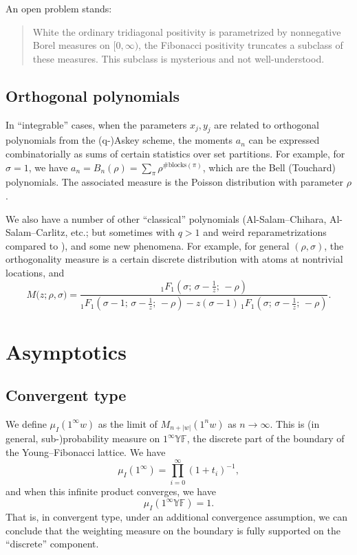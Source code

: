 \documentclass[letterpaper,11pt,oneside,reqno]{article}
\numberwithin{equation}{section}
\theoremstyle{definition}
\begin{document}
An open problem stands:
\begin{quote}
	White the ordinary tridiagonal positivity is parametrized by
	nonnegative
	Borel measures on $[0,\infty)$, the Fibonacci positivity
	truncates a subclass of these measures. This
	subclass is mysterious and not well-understood.
\end{quote}

\subsection{Orthogonal polynomials}

In ``integrable'' cases, when the
parameters $x_j,y_j$ are related to orthogonal polynomials
from the (q-)Askey scheme,
the moments $a_n$ can be expressed combinatorially
as sums of certain statistics over set partitions.
For example, for $\sigma=1$, we have
$a_n=B_n(\rho)=\sum_\pi \rho^{\#\text{blocks}(\pi)}$,
which are the Bell (Touchard) polynomials.
The associated measure is the Poisson distribution
with parameter $\rho$.

We also have a number of other ``classical'' polynomials
(Al-Salam--Chihara, Al-Salam--Carlitz, etc.; but sometimes with $q>1$ and
weird reparametrizations compared to \cite{Koekoek1996}),
and some new phenomena. For example, for general $(\rho,\sigma)$,
the orthogonality measure is
a certain discrete distribution with atoms at nontrivial locations, and
\begin{equation}
	\label{eq:MGF_shifted_charlier_solution}
	M\big(z;\rho, \sigma\big)
	= \frac{
	{_1F_1}\left(\sigma  ; \, \sigma - \frac{1}{z}  ; \, -\rho \right)
	}{
	{_1F_1}\left(\sigma - 1 ; \, \sigma - \frac{1}{z}  ; \, -\rho \right)
	- z (\sigma - 1) \, {_1F_1}\left(\sigma  ; \, \sigma - \frac{1}{z}  ; \, -\rho \right)
	}.
\end{equation}


\section{Asymptotics}

\subsection{Convergent type}

We define $\mu_I(1^\infty w)$ as the limit of
$M_{n+|w|}(1^n w)$ as $n\to\infty$.
This is (in general, sub-)probability measure on $1^\infty\mathbb{YF}$, the
discrete part of the boundary of the Young--Fibonacci lattice.
We have
\begin{equation*}
	\mu_I(1^\infty)=\prod_{i=0}^{\infty}(1+t_i)^{-1},
\end{equation*}
and when this infinite product converges, we have
\begin{equation*}
	\mu_I(1^\infty \mathbb{YF})=1.
\end{equation*}
That is, in convergent type, under an
additional convergence assumption,
we can conclude that the weighting measure
on the boundary is fully supported on the
``discrete'' component.
\end{document}
